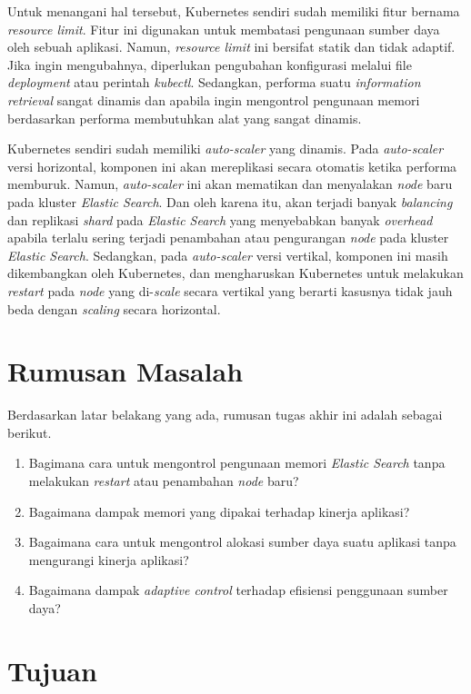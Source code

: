 Untuk menangani hal tersebut, Kubernetes sendiri sudah memiliki fitur bernama \textit{resource limit}. Fitur ini digunakan untuk membatasi pengunaan sumber daya oleh sebuah aplikasi. Namun, \textit{resource limit} ini bersifat statik dan tidak adaptif. Jika ingin mengubahnya, diperlukan pengubahan konfigurasi melalui file \textit{deployment} atau perintah \textit{kubectl}. Sedangkan, performa suatu \textit{information retrieval} sangat dinamis dan apabila ingin mengontrol pengunaan memori berdasarkan performa membutuhkan alat yang sangat dinamis.

Kubernetes sendiri sudah memiliki \textit{auto-scaler} yang dinamis. Pada \textit{auto-scaler} versi horizontal, komponen ini akan mereplikasi secara otomatis ketika performa memburuk. Namun, \textit{auto-scaler} ini akan mematikan dan menyalakan \textit{node} baru pada kluster \textit{Elastic Search}. Dan oleh karena itu, akan terjadi banyak \textit{balancing} dan replikasi \textit{shard} pada \textit{Elastic Search} yang menyebabkan banyak \textit{overhead} apabila terlalu sering terjadi penambahan atau pengurangan \textit{node} pada kluster \textit{Elastic Search}. Sedangkan, pada \textit{auto-scaler} versi vertikal, komponen ini masih dikembangkan oleh Kubernetes, dan mengharuskan Kubernetes untuk melakukan \textit{restart} pada \textit{node} yang di-\textit{scale} secara vertikal yang berarti kasusnya tidak jauh beda dengan \textit{scaling} secara horizontal.

\section{Rumusan Masalah}

Berdasarkan latar belakang yang ada, rumusan tugas akhir ini adalah sebagai berikut.
\begin{enumerate}
    \item Bagimana cara untuk mengontrol pengunaan memori \textit{Elastic Search} tanpa melakukan \textit{restart} atau penambahan \textit{node} baru?
    \item Bagaimana dampak memori yang dipakai terhadap kinerja aplikasi?
    \item Bagaimana cara untuk mengontrol alokasi sumber daya suatu aplikasi tanpa mengurangi kinerja aplikasi?
    \item Bagaimana dampak \textit{adaptive control} terhadap efisiensi penggunaan sumber daya?
\end{enumerate}

\section{Tujuan}

